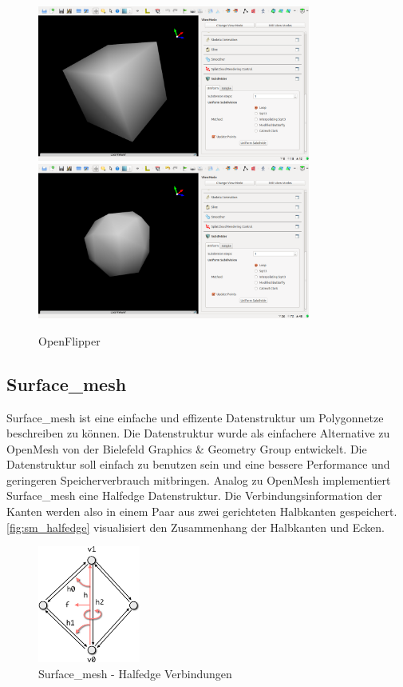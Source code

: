 \begin{figure}
  \centering
  \includegraphics[width=0.8\textwidth]{content/media/openflipper_cube}
  \includegraphics[width=0.8\textwidth]{content/media/openflipper_loop}
  \caption{OpenFlipper}
  \label{fig:openflipper}
\end{figure}


\subsection{Surface\_mesh}

Surface\_mesh \cite{Sieger.} ist eine einfache und effizente Datenstruktur um Polygonnetze beschreiben zu können.
Die Datenstruktur wurde als einfachere Alternative zu OpenMesh von der Bielefeld Graphics \& Geometry Group entwickelt.
Die Datenstruktur soll einfach zu benutzen sein und eine bessere Performance und geringeren Speicherverbrauch mitbringen.
Analog zu OpenMesh implementiert Surface\_mesh eine Halfedge Datenstruktur.
Die Verbindungsinformation der Kanten werden also in einem Paar aus zwei gerichteten Halbkanten gespeichert.
\autoref{fig:sm_halfedge} visualisiert den Zusammenhang der Halbkanten und Ecken.

\begin{figure}
  \centering
  \includegraphics[width=0.3\textwidth]{content/media/sm_connectivity-queries}
  \caption{Surface\_mesh - Halfedge Verbindungen \cite{OpenGP.24.07.2015}}
  \label{fig:sm_halfedge}
\end{figure}


